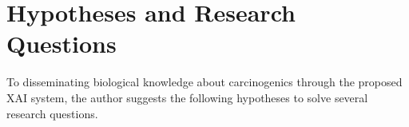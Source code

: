 \section{Hypotheses and Research Questions} \label{hypotheses}
To disseminating biological knowledge about carcinogenics through the proposed XAI system, the author suggests the following hypotheses to solve several research questions.  
